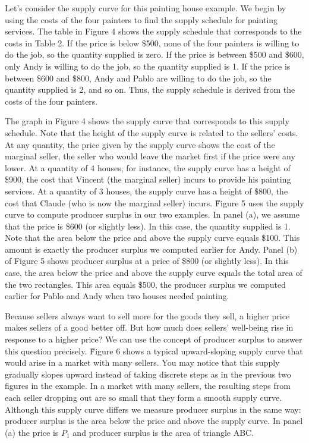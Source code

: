 Let's consider the supply curve for this painting house example. We begin by using the costs of the four painters to
find the supply schedule for painting services. The table in Figure 4 shows the supply schedule that corresponds to
the costs in Table 2. If the price is below \$500, none of the four painters is willing to do the job, so the
quantity supplied is zero. If the price is between \$500 and \$600, only Andy is willing to do the job, so the
quantity supplied is 1. If the price is between \$600 and \$800, Andy and Pablo are willing to do the job, so the
quantity supplied is 2, and so on. Thus, the supply schedule is derived from the costs of the four painters.


The graph in Figure 4 shows the supply curve that corresponds to this supply schedule. Note that the height of the
supply curve is related to the sellers' costs. At any quantity, the price given by the supply curve shows the cost of
the marginal seller, the seller who would leave the market first if the price were any lower. At a quantity of 4
houses, for instance, the supply curve has a height of \$900, the cost that Vincent (the marginal seller) incurs to
provide his painting services. At a quantity of 3 houses, the supply curve has a height of \$800, the cost that
Claude (who is now the marginal seller) incurs. \v

Figure 5 uses the supply curve to compute producer surplus in our two examples. In panel (a), we assume that the
price is \$600 (or slightly less). In this case, the quantity supplied is 1. Note that the area below the price and
above the supply curve equals \$100. This amount is exactly the producer surplus we computed earlier for Andy. Panel
(b) of Figure 5 shows producer surplus at a price of \$800 (or slightly less). In this case, the area below the price
and above the supply curve equals the total area of the two rectangles. This area equals \$500, the producer surplus
we computed earlier for Pablo and Andy when two houses needed painting.


Because sellers always want to sell more for the goods they sell, a higher price makes sellers of a good better off.
But how much does sellers' well-being rise in response to a higher price? We can use the concept of producer surplus
to answer this question precisely. \v

Figure 6 shows a typical upward-sloping supply curve that would arise in a market with many sellers. You may notice
that this supply gradually slopes upward instead of taking discrete steps as in the previous two figures in the
example. In a market with many sellers, the resulting steps from each seller dropping out are so small that they form
a smooth supply curve. Although this supply curve differs we measure producer surplus in the same way: producer
surplus is the area below the price and above the supply curve. In panel (a) the price is $P_1$ and producer surplus
is the area of triangle ABC.

